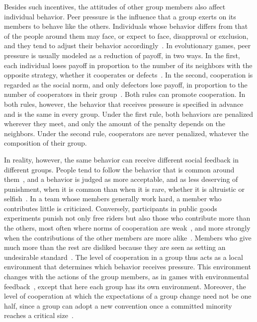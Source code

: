 \documentclass[%
  aip,cha,
  amsmath,amssymb,
  reprint,
  floatfix,
  article-title,
]{revtex4-2}
\begin{document}
Besides such incentives, the attitudes of other group members also affect individual behavior.
Peer pressure is the influence that a group exerts on its members to behave like the others.
Individuals whose behavior differs from that of the people around them may face, or expect to face, disapproval or exclusion, and they tend to adjust their behavior accordingly~\cite{asch1952social,cialdini2004social}.
In evolutionary games, peer pressure is usually modeled as a reduction of payoff, in two ways.
In the first, each individual loses payoff in proportion to the number of its neighbors with the opposite strategy, whether it cooperates or defects~\cite{yang2015peer,hu2021peer,gao2023impact,ma2025evolution}.
In the second, cooperation is regarded as the social norm, and only defectors lose payoff, in proportion to the number of cooperators in their group~\cite{deng2018peer}.
Both rules can promote cooperation.
In both rules, however, the behavior that receives pressure is specified in advance and is the same in every group.
Under the first rule, both behaviors are penalized wherever they meet, and only the amount of the penalty depends on the neighbors.
Under the second rule, cooperators are never penalized, whatever the composition of their group.

In reality, however, the same behavior can receive different social feedback in different groups.
People tend to follow the behavior that is common around them~\cite{cialdini1990focus,cialdini2004social,szolnoki2015conformity,xu2026synergistic}, and a behavior is judged as more acceptable, and as less deserving of punishment, when it is common than when it is rare, whether it is altruistic or selfish~\cite{lindstrom2018common}.
In a team whose members generally work hard, a member who contributes little is criticized.
Conversely, participants in public goods experiments punish not only free riders but also those who contribute more than the others, most often where norms of cooperation are weak~\cite{herrmann2008antisocial}, and more strongly when the contributions of the other members are more alike~\cite{irwin2013normative}.
Members who give much more than the rest are disliked because they are seen as setting an undesirable standard~\cite{parks2010desire}.
The level of cooperation in a group thus acts as a local environment that determines which behavior receives pressure.
This environment changes with the actions of the group members, as in games with environmental feedback~\cite{weitz2016oscillating,tilman2020evolutionary,wang2020eco,hu2025dynamic}, except that here each group has its own environment.
Moreover, the level of cooperation at which the expectations of a group change need not be one half, since a group can adopt a new convention once a committed minority reaches a critical size~\cite{centola2018experimental}.
\end{document}
